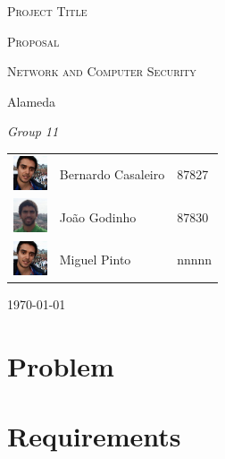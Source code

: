 \documentclass[a4paper,titlepage,11pt]{article}
\begin{document}
\begin{titlepage}
\begin{center}
  {\scshape \huge Project Title \par}                                                                         %
  \vspace{1cm}

  {\scshape \LARGE Proposal \par}
  \vspace{1.5cm}

  {\scshape \Large Network and Computer Security \par}
  \vspace{0.5cm}

  {\Large Alameda \par}
  \vfill

  {\itshape \Large Group 11 \par}
  \vfill

\begin{tabular}{l l l}
  \includegraphics[width=10mm, height=10mm]{img/bernardo.jpeg} & Bernardo Casaleiro & 87827\\
  \includegraphics[width=10mm, height=10mm]{img/joao.jpeg} & João Godinho & 87830\\                       %
  \includegraphics[width=10mm, height=10mm]{img/bernardo.jpeg} & Miguel Pinto & nnnnn\\                       %
\end{tabular}
  \vfill

  {\large \today\par}
\end{center}
\end{titlepage}

\section{Problem}

\section{Requirements}
\end{document}
